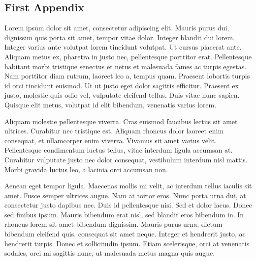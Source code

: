 \documentclass[twocolumn,10pt]{article}
\begin{document}
\begin{appendixenv}[Appendix]
    \section{First Appendix} \label{apx:first-appendix}

    Lorem ipsum dolor sit amet, consectetur adipiscing elit. Mauris purus dui, dignissim quis porta sit amet, tempor vitae dolor. Integer blandit dui lorem. Integer varius ante volutpat lorem tincidunt volutpat. Ut cursus placerat ante. Aliquam metus ex, pharetra in justo nec, pellentesque porttitor erat. Pellentesque habitant morbi tristique senectus et netus et malesuada fames ac turpis egestas. Nam porttitor diam rutrum, laoreet leo a, tempus quam. Praesent lobortis turpis id orci tincidunt euismod. Ut ut justo eget dolor sagittis efficitur. Praesent ex justo, molestie quis odio vel, vulputate eleifend tellus. Duis vitae nunc sapien. Quisque elit metus, volutpat id elit bibendum, venenatis varius lorem. 

    Aliquam molestie pellentesque viverra. Cras euismod faucibus lectus sit amet ultrices. Curabitur nec tristique est. Aliquam rhoncus dolor laoreet enim consequat, et ullamcorper enim viverra. Vivamus sit amet varius velit. Pellentesque condimentum luctus tellus, vitae interdum ligula accumsan at. Curabitur vulputate justo nec dolor consequat, vestibulum interdum nisl mattis. Morbi gravida luctus leo, a lacinia orci accumsan non.

    Aenean eget tempor ligula. Maecenas mollis mi velit, ac interdum tellus iaculis sit amet. Fusce semper ultrices augue. Nam at tortor eros. Nunc porta urna dui, at consectetur justo dapibus nec. Duis id pellentesque nisi. Sed et dolor lacus. Donec sed finibus ipsum. Mauris bibendum erat nisl, sed blandit eros bibendum in. In rhoncus lorem sit amet bibendum dignissim. Mauris purus urna, dictum bibendum eleifend quis, consequat sit amet neque. Integer et hendrerit justo, ac hendrerit turpis. Donec et sollicitudin ipsum. Etiam scelerisque, orci at venenatis sodales, orci mi sagittis nunc, ut malesuada metus magna quis augue. 
\end{appendixenv}
\end{document}
